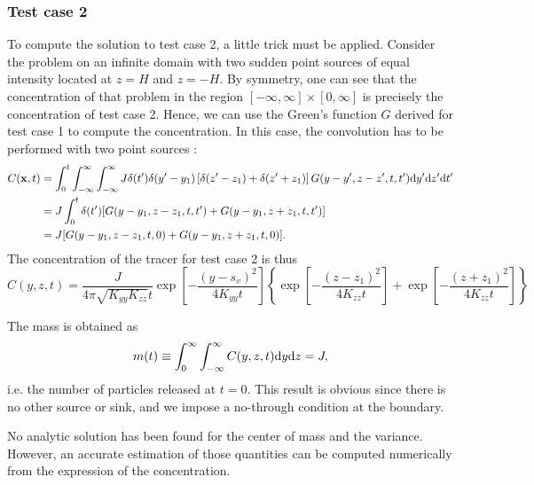 \subsubsection{Test case 2}
To compute the solution to test case 2, a little trick must be applied. Consider the problem on an infinite domain with two sudden point sources of equal intensity located at $z = H$ and $z = -H$. By symmetry, one can see that the concentration of that problem in the region $[-\infty, \infty] \times [0, \infty]$ is precisely the concentration of test case 2. Hence, we can use the Green's function $G$ derived for test case 1 to compute the concentration. In this case, the convolution has to be performed with two point sources :
\begin{align}
	C(\b x,t) &= \int_{0}^{t} \int_{-\infty}^{\infty} \int_{-\infty}^{\infty} J \delta(t') \delta(y'- y_1)\left[\delta(z'-z_1)+\delta(z'+z_1)\right] G(y-y',z-z',t,t') \rm dy' \rm dz' \rm dt' \nonumber\\
	&= J \int_{0}^{t} \delta(t')[G(y-y_1,z-z_1,t,t')+G(y-y_1,z+z_1,t,t')] \label{tc2_eq2} \nonumber\\
	&= J[G(y-y_1,z-z_1,t,0)+G(y-y_1,z+z_1,t,0)].
\end{align}
The concentration of the tracer for test case 2 is thus
\begin{equation}
	C(y,z,t) = \frac{J}{4\pi\sqrt{K_{yy}K_{zz}}t}\exp\left[-\frac{(y-s_v)^2}{4K_{yy}t}\right]\left\{\exp\left[-\frac{(z-z_1)^2}{4K_{zz}t} \right] + \exp\left[-\frac{(z+z_1)^2}{4K_{zz}t} \right] \right\}
\end{equation}

The mass is obtained as
\begin{equation}
	m(t) \equiv \int_{0}^{\infty} \int_{-\infty}^{\infty} C(y,z,t) \rm dy \rm dz = J,
\end{equation}
i.e. the number of particles released at $t=0$. This result is obvious since there is no other source or sink, and we impose a no-through condition at the boundary.

No analytic solution has been found for the center of mass and the variance. However, an accurate estimation of those quantities can be computed numerically from the expression of the concentration. 


